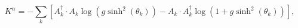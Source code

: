 \begin{equation}
K^{\alpha}=-\sum_{k}\left[ A_{k}^{\dagger }\cdot A_{k}
\log \left(g \sinh^{2}\left( \theta_{k}\right) \right) -
A_{k}\cdot A_{k}^{\dagger }\log \left(1+g\sinh^{2}\left(
\theta_{k} \right) \right) \right],
\end{equation}

